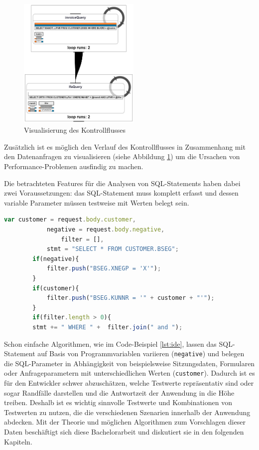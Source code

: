\begin{figure}[ht]
	\centering
  \includegraphics[width=0.52\textwidth]{figures/feedback.png}
	\caption{Visualisierung des Kontrollflusses}
	\label{fig:feedback}
\end{figure}

Zusätzlich ist es möglich den Verlauf des Kontrollflusses in Zusammenhang mit den Datenanfragen zu visualisieren \cite{Frahnow2014} (siehe Abbildung \ref{fig:feedback}) um die Ursachen von Performance-Problemen ausfindig zu machen.

Die betrachteten Features für die Analysen von SQL-Statements haben dabei zwei Voraussetzungen: das SQL-Statement muss komplett erfasst und dessen variable Parameter müssen testweise mit Werten belegt sein.

\begin{lstlisting}[caption={Variablen nehmen Einfluss auf die SQL-Query und -Parameter}, label={lst:ide}, language=JavaScript]
		var customer = request.body.customer,
		    negative = request.body.negative,
				filter = [],
		    stmt = "SELECT * FROM CUSTOMER.BSEG";
		if(negative){
			filter.push("BSEG.XNEGP = 'X'");
		}
		if(customer){
			filter.push("BSEG.KUNNR = '" + customer + "'");
		}
		if(filter.length > 0){
		stmt += " WHERE " +  filter.join(" and ");
\end{lstlisting}

Schon einfache Algorithmen, wie im Code-Beispiel \ref{lst:ide}, lassen das SQL-Statement auf Basis von Programmvariablen variieren (\texttt{negative}) und belegen die SQL-Parameter in Abhängigkeit von beispielsweise Sitzungsdaten, Formularen oder Anfrageparametern mit unterschiedlichen Werten (\texttt{customer}).
Dadurch ist es für den Entwickler schwer abzuschätzen, welche Testwerte repräsentativ sind oder sogar Randfälle darstellen und die Antwortzeit der Anwendung in die Höhe treiben.
Deshalb ist es wichtig sinnvolle Testwerte und Kombinationen von Testwerten zu nutzen, die die verschiedenen Szenarien innerhalb der Anwendung abdecken.
Mit der Theorie und möglichen Algorithmen zum Vorschlagen dieser Daten beschäftigt sich diese Bachelorarbeit und diskutiert sie in den folgenden Kapiteln.
